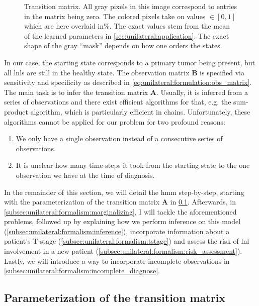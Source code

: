 \documentclass[\relativeRoot/main.tex]{subfiles}
\begin{document}
\begin{figure}
    \centering
    \def\svgwidth{0.8\textwidth}
    
    \caption{Transition matrix. All gray pixels in this image correspond to entries in the matrix being zero. The colored pixels take on values $\in [0, 1]$ which are here overlaid in\%. The exact values stem from the mean of the learned parameters in \cref{sec:unilateral:application}. The exact shape of the gray ``mask'' depends on how one orders the states.}
    \label{fig:unilateral:trans_matrix}
\end{figure}

In our case, the starting state corresponds to a primary tumor being present, but all \glspl{lnl} are still in the healthy state. The observation matrix $\mathbf{B}$ is specified via sensitivity and specificity as described in \cref{eq:unilateral:formulation:obs_matrix}. The main task is to infer the transition matrix $\mathbf{A}$. Usually, it is inferred from a series of observations and there exist efficient algorithms for that, e.g. the sum-product algorithm, which is particularly efficient in chains. Unfortunately, these algorithms cannot be applied for our problem for two profound reasons:

\begin{enumerate}
    \item We only have a single observation instead of a consecutive series of observations. 
    \item It is unclear how many time-steps it took from the starting state to the one observation we have at the time of diagnosis.
\end{enumerate}

In the remainder of this section, we will detail the \gls{hmm} step-by-step, starting with the parameterization of the transition matrix $\mathbf{A}$ in \cref{subsec:unilateral:formalism:parametrization}. Afterwards, in \cref{subsec:unilateral:formalism:marginalizing}, I will tackle the aforementioned problems, followed up by explaining how we perform inference on this model (\cref{subsec:unilateral:formalism:inference}), incorporate information about a patient's T-stage (\cref{subsec:unilateral:formalism:tstage}) and assess the risk of \gls{lnl} involvement in a new patient (\cref{subsec:unilateral:formalism:risk_assessment}). Lastly, we will introduce a way to incorporate incomplete observations in \cref{subsec:unilateral:formalism:incomplete_diagnose}.

\subsection{Parameterization of the transition matrix}
\label{subsec:unilateral:formalism:parametrization}
\end{document}

